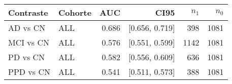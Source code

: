 \begin{tabular}{l l r r r r}
\toprule
Contraste & Cohorte & AUC & CI95 & $n_1$ & $n_0$ \\
\midrule
AD vs CN & ALL & 0.686 & [0.656, 0.719] & 398 & 1081 \\
MCI vs CN & ALL & 0.576 & [0.551, 0.599] & 1142 & 1081 \\
PD vs CN & ALL & 0.582 & [0.556, 0.609] & 636 & 1081 \\
PPD vs CN & ALL & 0.541 & [0.511, 0.573] & 388 & 1081 \\
\bottomrule
\end{tabular}
